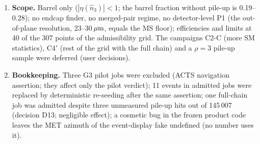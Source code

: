 \begin{enumerate}[resume]
  propagated into the limit ratios.
\item \textbf{Scope.} Barrel only ($|\eta(\hat n_3)|<1$; the barrel fraction without pile-up is 0.19--0.28); no endcap
  finder, no merged-pair regime, no detector-level P1 (the out-of-plane resolution, 23--30$\,\mu\mathrm{m}$, equals the MS floor);
  efficiencies and limits at 40 of the 307 points of the admissibility grid. The campaigns C2-C (more SM statistics), C4$'$
  (rest of the grid with the full chain) and a $\rho=3$ pile-up sample were deferred (user decisions).
\item \textbf{Bookkeeping.} Three G3 pilot jobs were excluded (ACTS navigation assertion; they affect only the pilot
  verdict); 11 events in admitted jobs were replaced by deterministic re-seeding after the same assertion; one full-chain job
  was admitted despite three unmeasured pile-up hits out of 145\,007 (decision D13; negligible effect); a cosmetic bug in the
  frozen product code leaves the MET azimuth of the event-display fake undefined (no number uses it).
\end{enumerate}
